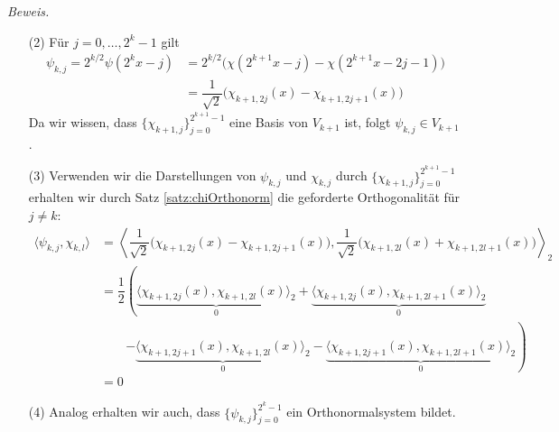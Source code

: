 \textit{Beweis.} 
\begin{enumerate}
  \item[(2)] 
  Für $j=0,\dots,2^k-1$ gilt 
  \begin{align*}
    \psi_{k,j} 
    = 2^{k/2}\psi(2^kx-j) 
    &= 2^{k/2}\Big(\chi(2^{k+1}x-j)-\chi(2^{k+1}x-2j-1)\Big) \\
    &= \dfrac{1}{\sqrt{2}}\Big(\chi_{k+1,2j}(x) - \chi_{k+1,2j+1}(x)\Big)
  \end{align*}
  Da wir wissen, dass $\{\chi_{k+1,j}\}_{j=0}^{2^{k+1}-1}$ eine Basis von $V_{k+1}$ ist, folgt $\psi_{k,j}\in V_{k+1}$.
  \item[(3)] Verwenden wir die Darstellungen von $\psi_{k,j}$ und $\chi_{k,j}$ durch $\{\chi_{k+1,j}\}_{j=0}^{2^{k+1}-1}$
  erhalten wir durch Satz \ref{satz:chiOrthonorm} die geforderte Orthogonalität für $j\neq k$:
  \begin{align*}
    \langle \psi_{k,j}, \chi_{k,l} \rangle
    &= \left\langle \dfrac{1}{\sqrt{2}}\Big(\chi_{k+1,2j}(x) - \chi_{k+1,2j+1}(x)\Big), 
    \dfrac{1}{\sqrt{2}}\Big(\chi_{k+1,2l}(x) + \chi_{k+1,2l+1}(x)\Big) \right\rangle _2 \\
    &= \dfrac{1}{2}\left(
      \underbrace{\langle \chi_{k+1,2j}(x), \chi_{k+1,2l}(x) \rangle_2}_{0}
      + \underbrace{\langle \chi_{k+1,2j}(x), \chi_{k+1,2l+1}(x) \rangle_2}_{0}\right.\\
      &\qquad \left.- \underbrace{\langle \chi_{k+1,2j+1}(x), \chi_{k+1,2l}(x) \rangle_2}_{0}
      - \underbrace{\langle \chi_{k+1,2j+1}(x), \chi_{k+1,2l+1}(x) \rangle_2}_{0} 
    \right)\\
    &= 0
  \end{align*}
  \item[(4)] Analog erhalten wir auch, dass $\{\psi_{k,j}\}_{j=0}^{2^k-1}$ ein Orthonormalsystem bildet.
\end{enumerate}

